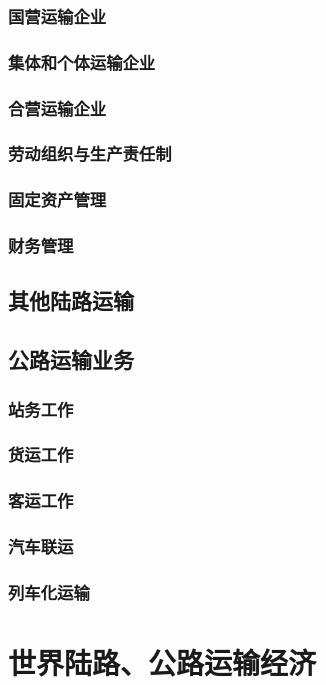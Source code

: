 \documentclass[UTF8]{../../RepresentationUniverse}
\begin{document}
        \subsubsection{国营运输企业}
        \subsubsection{集体和个体运输企业}
        \subsubsection{合营运输企业}
        \subsubsection{劳动组织与生产责任制}
        \subsubsection{固定资产管理}
        \subsubsection{财务管理}
    \subsection{其他陆路运输}
    \subsection{公路运输业务}
        \subsubsection{站务工作}
        \subsubsection{货运工作}
        \subsubsection{客运工作}
        \subsubsection{汽车联运}
        \subsubsection{列车化运输}

\section{世界陆路、公路运输经济}
\end{document}
